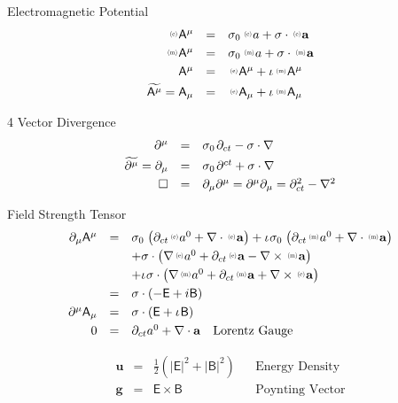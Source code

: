 \documentclass[aps,twocolumn,secnumarabic,nobalancelastpage,amsmath,amssymb,
amsthm,nofootinbib,parskip=full]{revtex4}
\numberwithin{equation}{section}
\newcommand{\abs}[1]{\left|#1\right|}
\newcommand{\adjoint}[1]{\widetilde{#1}}
\newcommand{\iu}{\iota\mkern1mu}
\newcommand{\pauli}[1]{\sigma_#1\mkern2mu}
\newcommand{\qv}[1]{\mathbf{\mathsf{#1}}}
\newcommand{\ppv}[2]{{\,\raisebox{2pt}{\scalebox{.5}{(#1)\,}}}#2}
\newcommand{\qvl}[2]{\ppv{#1}{\mathbf{\mathsf{#2}}}}
\newcommand{\sv}[1]{\mathbf{#1}}
\newcommand{\svl}[2]{\ppv{#1}{\sv{#2}}}
\newcommand{\ssl}[2]{\ppv{#1}{#2}}
\begin{document}
Electromagnetic Potential
\begin{equation*}
\begin{array}{rcl}
\qvl{e}{A}^\mu&=&\pauli{0}\ssl{e}{a}+\sigma\cdot\svl{e}{a} \\[3pt]
\qvl{m}{A}^\mu&=&\pauli{0}\ssl{m}{a}+\sigma\cdot\svl{m}{a} \\[3pt]
\qv{A}^\mu&=&\qvl{e}{A}^\mu+\iu\qvl{m}{A}^\mu \\[3pt]
\adjoint{\qv{A}^\mu}=\qv{A}_\mu&=&\qvl{e}{A}_\mu+\iu\qvl{m}{A}_\mu
\end{array}
\end{equation*}

4 Vector Divergence
\begin{equation*}
\begin{array}{rcl}
\partial^\mu&=&\pauli{0}\partial_{ct}-\sigma\cdot\nabla \\[3pt]
\adjoint{\partial^\mu}=\partial_\mu&=&
               \pauli{0}\partial^{ct}+\sigma\cdot\nabla \\[3pt]
\Box&=&\partial_\mu\partial^\mu=\partial^\mu\partial_\mu=
               \partial_{ct}^2-\nabla^2
\end{array}
\end{equation*}

Field Strength Tensor
\begin{equation*}
\begin{array}{rcl}
\partial_\mu\qv{A}^\mu&=&
    \pauli{0}\left(\partial_{ct}\ssl{e}{a}^0+\nabla\cdot\svl{e}{a}\right)
    +\iu\pauli{0}\left(\partial_{ct}\ssl{m}{a}^0+\nabla\cdot\svl{m}{a}\right)
              \\[3pt]
 &&+\sigma\cdot\left(\nabla\ssl{e}{a}^0+\partial_{ct}\svl{e}{a}
                  -\nabla\times\svl{m}{a}\right) \\[3pt]
 &&+\iu\sigma\cdot\left(\nabla\ssl{m}{a}^0+\partial_{ct}\svl{m}{a}
                  +\nabla\times\svl{e}{a}\right) \\[3pt]
               &=&\sigma\cdot\left(-\qv{E}+i\qv{B}\right) \\[3pt]
\partial^\mu\qv{A}_\mu&=&
                   \sigma\cdot\left(\qv{E}+\iu\qv{B}\right) \\[3pt]
0&=&\partial_{ct}a^0+\nabla\cdot\mathbf{a}\quad\text{Lorentz Gauge}
\end{array}
\end{equation*}

\begin{equation*}
\begin{array}{rclll}
\mathbf{u}&=&\frac{1}{2}\left(\abs{\qv{E}}^2+\abs{\qv{B}}^2\right)
&&\text{Energy Density} \\[3pt]
\mathbf{g}&=&\qv{E}\times\qv{B} &&\text{Poynting Vector}
\end{array}
\end{equation*}
\end{document}
